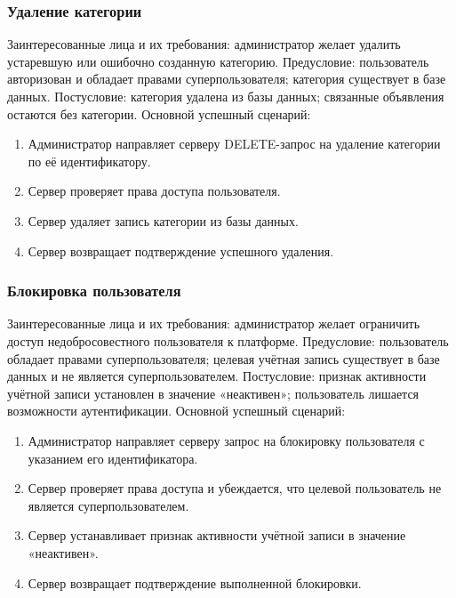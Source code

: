 \subsubsection{Удаление категории}
Заинтересованные лица и их требования: администратор желает удалить устаревшую или ошибочно созданную категорию.
Предусловие: пользователь авторизован и обладает правами суперпользователя; категория существует в базе данных.
Постусловие: категория удалена из базы данных; связанные объявления остаются без категории.
Основной успешный сценарий:
\begin{enumerate}
\item Администратор направляет серверу DELETE-запрос на удаление категории по её идентификатору.
\item Сервер проверяет права доступа пользователя.
\item Сервер удаляет запись категории из базы данных.
\item Сервер возвращает подтверждение успешного удаления.
\end{enumerate}

\subsubsection{Блокировка пользователя}
Заинтересованные лица и их требования: администратор желает ограничить доступ недобросовестного пользователя к платформе.
Предусловие: пользователь обладает правами суперпользователя; целевая учётная запись существует в базе данных и не является суперпользователем.
Постусловие: признак активности учётной записи установлен в значение «неактивен»; пользователь лишается возможности аутентификации.
Основной успешный сценарий:
\begin{enumerate}
\item Администратор направляет серверу запрос на блокировку пользователя с указанием его идентификатора.
\item Сервер проверяет права доступа и убеждается, что целевой пользователь не является суперпользователем.
\item Сервер устанавливает признак активности учётной записи в значение «неактивен».
\item Сервер возвращает подтверждение выполненной блокировки.
\end{enumerate}

